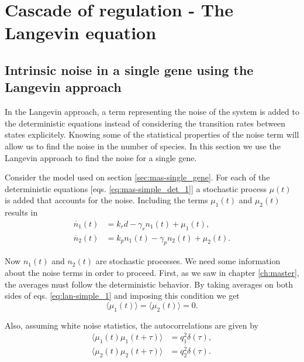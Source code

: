 \chapter{Cascade of regulation - The Langevin equation}
\label{ch:langevin}

\section{Intrinsic noise in a single gene using the Langevin approach}
\label{sec:lan-single}
In the Langevin approach, a term representing the noise of the system is added to the deterministic equations instead of considering the transition rates between states explicitely. Knowing some of the statistical properties of the noise term will allow us to find the noise in the number of species. In this section we use the Langevin approach to find the noise for a single gene.

Consider the model used on section \ref{sec:mas-single_gene}. For each of the deterministic equations [eqs. \eqref{eq:mas-simple_det_1}] a stochastic process $\mu(t)$ is added that accounts for the noise. Including the terms $\mu_1(t)$ and $\mu_2(t)$ results in
\begin{equation}
  \label{eq:lan-simple_1}
  \begin{split}
    \dot{n_1}(t) &= k_rd-\gamma_rn_1(t) + \mu_1(t),\\
    \dot{n_2}(t) &= k_pn_1(t)-\gamma_pn_2(t) + \mu_2(t).
  \end{split}
\end{equation}

Now $n_1(t)$ and $n_2(t)$ are stochastic processes. We need some information about the noise terms in order to proceed. First, as we saw in chapter \ref{ch:master}, the averages must follow the deterministic behavior. By taking averages on both sides of eqs. \eqref{eq:lan-simple_1} and imposing this condition we get
\begin{equation*}
  \langle\mu_1(t)\rangle = \langle\mu_2(t)\rangle = 0.
\end{equation*}

Also, assuming white noise statistics, the autocorrelations are given by
\begin{align}
  \langle\mu_1(t)\mu_1(t+\tau)\rangle &= q_1^2\delta(\tau),\label{eq:lan-simple_cor1} \\
  \langle\mu_2(t)\mu_2(t+\tau)\rangle &= q_2^2\delta(\tau). \label{eq:lan-simple_cor2}
\end{align}

